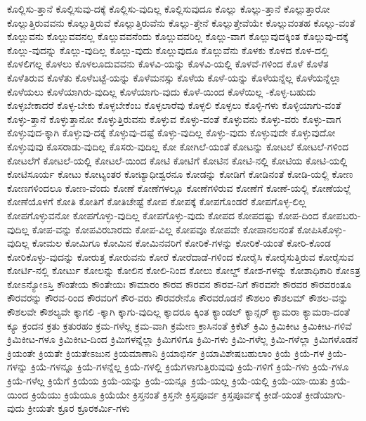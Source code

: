 {ಕೊಲ್ಲಿಸು-ತ್ತಾನೆ
ಕೊಲ್ಲಿಸುವು-ದಕ್ಕೆ
ಕೊಲ್ಲಿಸು-ವುದಿಲ್ಲ
ಕೊಲ್ಲಿಸುವುದೂ
ಕೊಲ್ಲು
ಕೊಲ್ಲು-ತ್ತಾನೆ
ಕೊಲ್ಲುತ್ತಾರೋ
ಕೊಲ್ಲುತ್ತಿರುವವನು
ಕೊಲ್ಲುತ್ತಿರುವೆ
ಕೊಲ್ಲುತ್ತಿರುವೆನು
ಕೊಲ್ಲು-ತ್ತೇನೆ
ಕೊಲ್ಲುತ್ತೇವೆಯೇ
ಕೊಲ್ಲುವಂತಹ
ಕೊಲ್ಲು-ವಂತೆ
ಕೊಲ್ಲುವನು
ಕೊಲ್ಲುವವನಲ್ಲ
ಕೊಲ್ಲುವವನೆಂದು
ಕೊಲ್ಲುವವರಿಲ್ಲ
ಕೊಲ್ಲು-ವಾಗ
ಕೊಲ್ಲುವುದಕ್ಕಿಂತ
ಕೊಲ್ಲುವು-ದಕ್ಕೆ
ಕೊಲ್ಲು-ವುದನ್ನು
ಕೊಲ್ಲು-ವುದಿಲ್ಲ
ಕೊಲ್ಲು-ವುದು
ಕೊಲ್ಲುವುದೂ
ಕೊಲ್ಲುವೆನು
ಕೊಳಕು
ಕೊಳದ
ಕೊಳ-ದಲ್ಲಿ
ಕೊಳಲಿಗಲ್ಲ
ಕೊಳಲು
ಕೊಳಲೂದುವವನು
ಕೊಳವಿ-ಯನ್ನು
ಕೊಳವಿ-ಯಲ್ಲಿ
ಕೊಳವೆ-ಗಳಿಂದ
ಕೊಳೆ
ಕೊಳೆತ
ಕೊಳೆತಿರುವ
ಕೊಳೆತು
ಕೊಳೆಬಟ್ಟೆ-ಯನ್ನು
ಕೊಳೆಮನಸ್ಸು
ಕೊಳೆಯ
ಕೊಳೆ-ಯನ್ನು
ಕೊಳೆಯನ್ನೆಲ್ಲ
ಕೊಳೆಯನ್ನೆಲ್ಲಾ
ಕೊಳೆಯಲು
ಕೊಳೆಯಾಗಿರು-ವುದಿಲ್ಲ
ಕೊಳೆಯಾಗು-ವುದು
ಕೊಳೆ-ಯಿಂದ
ಕೊಳೆಯಿಲ್ಲ
-ಕೊಳ್ಳ-ಬಹುದು
ಕೊಳ್ಳಬೇಕಾದರೆ
ಕೊಳ್ಳ-ಬೇಕು
ಕೊಳ್ಳಬೇಕೆಂಬ
ಕೊಳ್ಳಲಾರೆವು
ಕೊಳ್ಳಲಿ
ಕೊಳ್ಳಲು
ಕೊಳ್ಳಿ-ಗಳು
ಕೊಳ್ಳಿಯಾಗು-ವಂತೆ
ಕೊಳ್ಳು-ತ್ತಾನೆ
ಕೊಳ್ಳುತ್ತಾನೋ
ಕೊಳ್ಳುತ್ತಿರುವನು
ಕೊಳ್ಳುವ
ಕೊಳ್ಳು-ವಂತೆ
ಕೊಳ್ಳುವನು
ಕೊಳ್ಳು-ವರು
ಕೊಳ್ಳು-ವಾಗ
ಕೊಳ್ಳುವುದ-ಕ್ಕಾಗಿ
ಕೊಳ್ಳುವು-ದಕ್ಕೆ
ಕೊಳ್ಳುವು-ದಷ್ಟೆ
ಕೊಳ್ಳು-ವುದಿಲ್ಲ
ಕೊಳ್ಳು-ವುದು
ಕೊಳ್ಳುವುದೇ
ಕೊಳ್ಳುವುದೋ
ಕೊಳ್ಳುವುವು
ಕೊಸರಾಡು-ವುದಿಲ್ಲ
ಕೊಸರು-ವುದಿಲ್ಲ
ಕೋ
ಕೋಗಿಲೆ-ಯಂತೆ
ಕೋಟನ್ನು
ಕೋಟಲೆ
ಕೋಟಲೆ-ಗಳಿಂದ
ಕೋಟಲೆಗೆ
ಕೋಟಲೆ-ಯಲ್ಲಿ
ಕೋಟಲೆ-ಯಿಂದ
ಕೋಟಿ
ಕೋಟಿಗೆ
ಕೋಟಿನ
ಕೋಟಿ-ನಲ್ಲಿ
ಕೋಟಿಯ
ಕೋಟಿ-ಯಲ್ಲಿ
ಕೋಟಿಸೂರ್ಯ
ಕೋಟು
ಕೋಟ್ಯಂತರ
ಕೋಟ್ಯಾಧೀಶ್ವರನೂ
ಕೋಡನ್ನು
ಕೋಡಿಗೆ
ಕೋಡಿನಂತೆ
ಕೋಡಿ-ಯಲ್ಲಿ
ಕೋಣ
ಕೋಣಗಳಿಂದಲೂ
ಕೋಣ-ವೆಂದು
ಕೋಣೆ
ಕೋಣೆಗಳಲ್ಲೂ
ಕೋಣೆಗಳಿರುವ
ಕೋಣೆಗೆ
ಕೋಣೆ-ಯಲ್ಲಿ
ಕೋಣೆಯಲ್ಲೆ
ಕೋಣೆಯೊಳಗೆ
ಕೋತಿ
ಕೋತಿಗೆ
ಕೋತಿಚೇಷ್ಟೆ
ಕೋಪ
ಕೋಪಕ್ಕೆ
ಕೋಪಗೊಂಡರೆ
ಕೋಪಗೊಳ್ಳ-ಲಿಲ್ಲ
ಕೋಪಗೊಳ್ಳುವನೋ
ಕೋಪಗೊಳ್ಳು-ವುದಿಲ್ಲ
ಕೋಪಗೊಳ್ಳು-ವುದು
ಕೋಪದ
ಕೋಪದಷ್ಟು
ಕೋಪ-ದಿಂದ
ಕೋಪಬರು-ವುದಿಲ್ಲ
ಕೋಪ-ವನ್ನು
ಕೋಪವಿರಬಾರದು
ಕೋಪ-ವಿಲ್ಲ
ಕೋಪವೂ
ಕೋಪವೇ
ಕೋಪಾನಲನಂತೆ
ಕೋಪಿಸಿಕೊಳ್ಳು-ವುದಿಲ್ಲ
ಕೋಮಲ
ಕೋಮಿಗೂ
ಕೋಮಿನ
ಕೋಮಿನವರಿಗೆ
ಕೋರಿಕೆ-ಗಳನ್ನು
ಕೋರಿಕೆ-ಯಂತೆ
ಕೋರಿ-ಕೊಂಡ
ಕೋರಿಕೊಳ್ಳು-ವುದನ್ನು
ಕೋರುತ್ತ
ಕೋರುವನು
ಕೋರೆ
ಕೋರೆದಾಡೆ-ಗಳಿಂದ
ಕೋರೈಸಿ
ಕೋರೈಸುತ್ತಿರುವ
ಕೋರೈಸುವ
ಕೋರ್ಟಿ-ನಲ್ಲಿ
ಕೋರ್ಟು
ಕೋಲನ್ನು
ಕೋಲಿನ
ಕೋಲಿ-ನಿಂದ
ಕೋಲು
ಕೋಲ್ಡ್
ಕೋಶ-ಗಳನ್ನು
ಕೋಶಾಧಿಕಾರಿ
ಕೋಽತ್ರ
ಕೋಽನ್ಯೋಽಸ್ತಿ
ಕೌಂತೇಯ
ಕೌಂತೇಯಃ
ಕೌಮಾರಂ
ಕೌರವ
ಕೌರವನ
ಕೌರವ-ನಿಗೆ
ಕೌರವನೇ
ಕೌರವರ
ಕೌರವರಂತೂ
ಕೌರವರನ್ನು
ಕೌರವ-ರಿಂದ
ಕೌರವರಿಗೆ
ಕೌರ-ವರು
ಕೌರವರೇನೊ
ಕೌರವರೊಡನೆ
ಕೌಶಲಂ
ಕೌಶಲಮ್
ಕೌಶಲ-ವನ್ನು
ಕೌಶಲವೇ
ಕೌಶಲ್ಯವೇ
ಕ್ಕಾಗಲಿ
-ಕ್ಕಾಗಿ
ಕ್ಕಾಗು-ವುದಿಲ್ಲ
ಕ್ಕಾದರೂ
ಕ್ಕಿಂತ
ಕ್ಯಾಂಡಲ್
ಕ್ಯಾನ್ಸರ್
ಕ್ಯಾಮರಾ
ಕ್ಯಾಮರಾ-ದಂತೆ
ಕ್ಯೂ
ಕ್ರಂದನ
ಕ್ರತು
ಕ್ರತುರಹಂ
ಕ್ರಮ-ಗಳೆಲ್ಲ
ಕ್ರಮ-ವಾಗಿ
ಕ್ರಮೇಣ
ಕ್ರಾಸಿನಂತೆ
ಕ್ರಿಕೆಟ್
ಕ್ರಿಮಿ
ಕ್ರಿಮಿಕೀಟ
ಕ್ರಿಮಿಕೀಟ-ಗಳಿವೆ
ಕ್ರಿಮಿಕೀಟ-ಗಳೂ
ಕ್ರಿಮಿಕೀಟ-ದಿಂದ
ಕ್ರಿಮಿಗಳನ್ನೆಲ್ಲಾ
ಕ್ರಿಮಿಗಳಿಗೂ
ಕ್ರಿಮಿ-ಗಳು
ಕ್ರಿಮಿ-ಗಳೆಲ್ಲ
ಕ್ರಿಮಿ-ಗಳೆಲ್ಲಾ
ಕ್ರಿಮಿಗಳೊಡನೆ
ಕ್ರಿಯಂತೇ
ಕ್ರಿಯತೇ
ಕ್ರಿಯತೇಽಜುನ
ಕ್ರಿಯಮಾಣಾನಿ
ಕ್ರಿಯಾಭಿರ್ನ
ಕ್ರಿಯಾವಿಶೇಷಬಹುಲಾಂ
ಕ್ರಿಯೆ
ಕ್ರಿಯೆ-ಗಳ
ಕ್ರಿಯೆ-ಗಳನ್ನು
ಕ್ರಿಯೆ-ಗಳನ್ನೂ
ಕ್ರಿಯೆ-ಗಳನ್ನೆಲ್ಲ
ಕ್ರಿಯೆ-ಗಳಲ್ಲಿ
ಕ್ರಿಯೆಗಳಾಗುತ್ತಿರುವುವು
ಕ್ರಿಯೆ-ಗಳಿಗೆ
ಕ್ರಿಯೆ-ಗಳು
ಕ್ರಿಯೆ-ಗಳೂ
ಕ್ರಿಯೆ-ಗಳೆಲ್ಲ
ಕ್ರಿಯೆಗೆ
ಕ್ರಿಯೆಯ
ಕ್ರಿಯೆ-ಯನ್ನು
ಕ್ರಿಯೆ-ಯನ್ನೂ
ಕ್ರಿಯೆ-ಯಲ್ಲ
ಕ್ರಿಯೆ-ಯಲ್ಲಿ
ಕ್ರಿಯೆ-ಯಾ-ಯಿತು
ಕ್ರಿಯೆ-ಯಿಂದ
ಕ್ರಿಯೆಯು
ಕ್ರಿಯೆಯೂ
ಕ್ರಿಯೆಯೇ
ಕ್ರಿಸ್ತನಂತೆ
ಕ್ರಿಸ್ತನೇ
ಕ್ರಿಸ್ತಪೂರ್ವ
ಕ್ರಿಸ್ತಪೂರ್ವಕ್ಕೆ
ಕ್ರೀಡೆ-ಯಂತೆ
ಕ್ರೀಡೆಯಾಗು-ವುದು
ಕ್ರೀಯತೇ
ಕ್ರೂರ
ಕ್ರೂರಕರ್ಮಿ-ಗಳು
}
